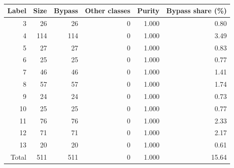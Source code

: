 \begin{table}[!htbp]
\caption{}
\label{tab:r2c5-shuttle}
\centering\small\setlength{\tabcolsep}{5pt}
\begin{tabular}{rrrrrr}
\toprule
\rowcolor{RevisionBackground} Label & Size & Bypass & Other classes & Purity & Bypass share (\%) \\
\midrule
\rowcolor{RevisionBackground} 3 & 26 & 26 & 0 & 1.000 & 0.80 \\
\rowcolor{RevisionBackground} 4 & 114 & 114 & 0 & 1.000 & 3.49 \\
\rowcolor{RevisionBackground} 5 & 27 & 27 & 0 & 1.000 & 0.83 \\
\rowcolor{RevisionBackground} 6 & 25 & 25 & 0 & 1.000 & 0.77 \\
\rowcolor{RevisionBackground} 7 & 46 & 46 & 0 & 1.000 & 1.41 \\
\rowcolor{RevisionBackground} 8 & 57 & 57 & 0 & 1.000 & 1.74 \\
\rowcolor{RevisionBackground} 9 & 24 & 24 & 0 & 1.000 & 0.73 \\
\rowcolor{RevisionBackground} 10 & 25 & 25 & 0 & 1.000 & 0.77 \\
\rowcolor{RevisionBackground} 11 & 76 & 76 & 0 & 1.000 & 2.33 \\
\rowcolor{RevisionBackground} 12 & 71 & 71 & 0 & 1.000 & 2.17 \\
\rowcolor{RevisionBackground} 13 & 20 & 20 & 0 & 1.000 & 0.61 \\
\midrule
\rowcolor{RevisionBackground} Total & 511 & 511 & 0 & 1.000 & 15.64 \\
\bottomrule
\end{tabular}
\par\smallskip\begin{minipage}{\linewidth}\footnotesize
{}
\end{minipage}
\end{table}
